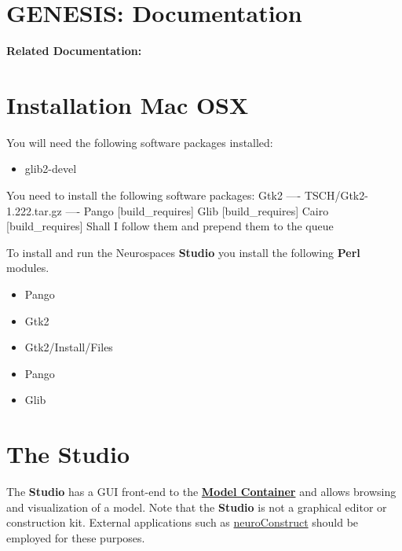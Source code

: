 \documentclass[12pt]{article}
\begin{document}
\section*{GENESIS: Documentation}

{\bf Related Documentation:}

\section*{Installation Mac OSX}

You will need the following software packages installed:

\begin{itemize}
\item[] glib2-devel
\end{itemize}

You need to install the following software packages:
Gtk2
----          TSCH/Gtk2-1.222.tar.gz          ----
    Pango [build_requires]
    Glib [build_requires]
    Cairo [build_requires]
Shall I follow them and prepend them to the queue

\begin{itemize}

\end{itemize}

To install and run the Neurospaces {\bf Studio} you install the following {\bf Perl} modules.


\begin{itemize}
\item[] Pango
\item[] Gtk2
\item[] Gtk2/Install/Files
\item[] Pango
\item[] Glib
\end{itemize}


\section*{The Studio}

The {\bf Studio} has a GUI front-end to the \href{../model-container/model-container.tex}{\bf Model Container} and allows browsing and visualization of a model. Note that the {\bf Studio} is not a graphical editor or construction kit. External applications such as \href{http://www.physiol.ucl.ac.uk/research/silver\_a/neuroConstruct/}{neuroConstruct} should be employed for these purposes.
\end{document}
